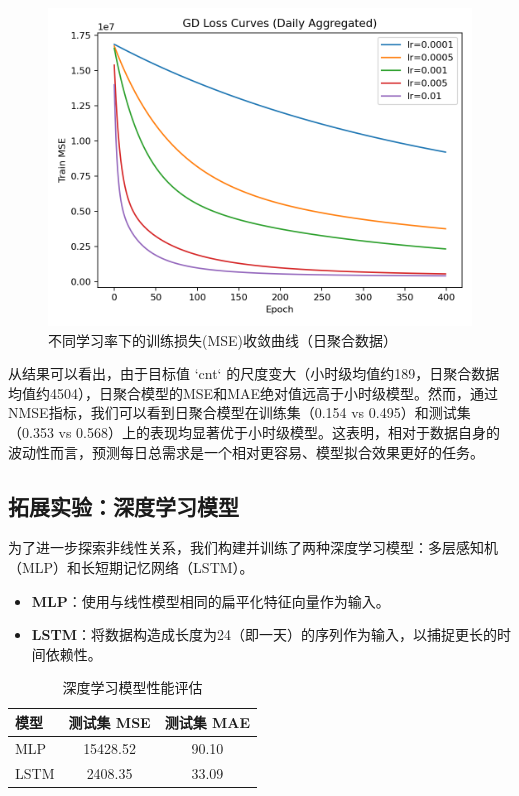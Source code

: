 \documentclass[UTF8,a4paper,10pt]{ctexart}
\begin{document}
\begin{figure}[H]
    \centering
    \includegraphics[width=0.7\linewidth]{pic/gd_loss_curves_daily.png}
    \caption{不同学习率下的训练损失(MSE)收敛曲线（日聚合数据）}
    \label{fig:loss_curve_daily}
\end{figure}

从结果可以看出，由于目标值 `cnt` 的尺度变大（小时级均值约189，日聚合数据均值约4504），日聚合模型的MSE和MAE绝对值远高于小时级模型。然而，通过NMSE指标，我们可以看到日聚合模型在训练集（0.154 vs 0.495）和测试集（0.353 vs 0.568）上的表现均显著优于小时级模型。这表明，相对于数据自身的波动性而言，预测每日总需求是一个相对更容易、模型拟合效果更好的任务。

\subsection{拓展实验：深度学习模型}
为了进一步探索非线性关系，我们构建并训练了两种深度学习模型：多层感知机（MLP）和长短期记忆网络（LSTM）。
\begin{itemize}
    \item \textbf{MLP}：使用与线性模型相同的扁平化特征向量作为输入。
    \item \textbf{LSTM}：将数据构造成长度为24（即一天）的序列作为输入，以捕捉更长的时间依赖性。
\end{itemize}

\begin{table}[H]
    \centering
    \caption{深度学习模型性能评估}
    \begin{tabular}{lcc}
        \toprule
        \textbf{模型} & \textbf{测试集 MSE} & \textbf{测试集 MAE} \\
        \midrule
        MLP & 15428.52 & 90.10 \\
        LSTM & 2408.35 & 33.09 \\
        \bottomrule
    \end{tabular}
\end{table}
\end{document}
